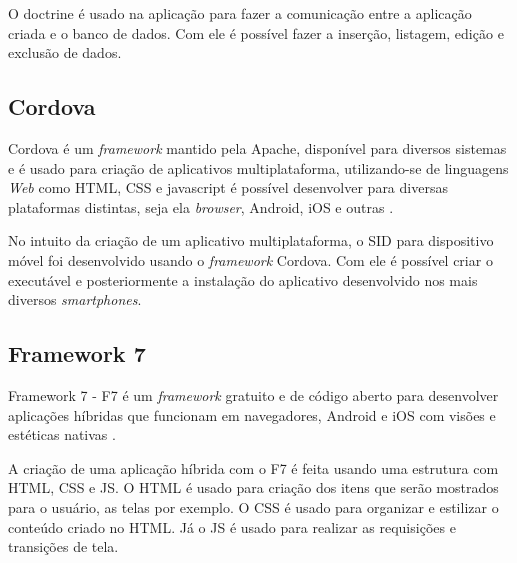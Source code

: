 O doctrine é usado na aplicação para fazer a comunicação entre a aplicação criada e o banco de dados. Com ele é possível fazer a inserção, listagem, edição e exclusão de dados.

\subsection{Cordova}
Cordova é um \textit{framework} mantido pela Apache, disponível para diversos sistemas e é usado para criação de aplicativos multiplataforma, utilizando-se de linguagens \textit{Web} como HTML, CSS e javascript é possível desenvolver para diversas plataformas distintas, seja ela \textit{browser}, Android, iOS e outras \citet{prezotto2017}.

No intuito da criação de um aplicativo multiplataforma, o SID para dispositivo móvel foi desenvolvido usando o \textit{framework} Cordova. Com ele é possível criar o executável e posteriormente a instalação do aplicativo desenvolvido nos mais diversos \textit{smartphones}.

\subsection{Framework 7}
Framework 7 - F7 é um \textit{framework} gratuito e de código aberto para desenvolver aplicações híbridas que funcionam em navegadores, Android e iOS com visões e estéticas nativas \citet{f72018}.

A criação de uma aplicação híbrida com o F7 é feita usando uma estrutura com HTML, CSS e JS. O HTML é usado para criação dos itens que serão mostrados para o usuário, as telas por exemplo. O CSS é usado para organizar e estilizar o conteúdo criado no HTML. Já o JS é usado para realizar as requisições e transições de tela.